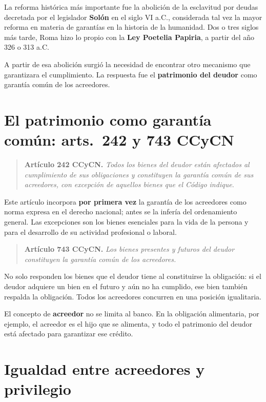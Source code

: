 \documentclass[12pt,oneside]{book}
\begin{document}
La reforma histórica más importante fue la abolición de la esclavitud por deudas decretada por el legislador \textbf{Solón} en el siglo VI a.C., considerada tal vez la mayor reforma en materia de garantías en la historia de la humanidad. Dos o tres siglos más tarde, Roma hizo lo propio con la \textbf{Ley Poetelia Papiria}, a partir del año 326 o 313 a.C.

A partir de esa abolición surgió la necesidad de encontrar otro mecanismo que garantizara el cumplimiento. La respuesta fue el \textbf{patrimonio del deudor} como garantía común de los acreedores.

\section{El patrimonio como garantía común: arts.~242 y 743 CCyCN}

\begin{quote}
\textbf{Artículo 242 CCyCN.} \textit{Todos los bienes del deudor están afectados al cumplimiento de sus obligaciones y constituyen la garantía común de sus acreedores, con excepción de aquellos bienes que el Código indique.}
\end{quote}

Este artículo incorpora \textbf{por primera vez} la garantía de los acreedores como norma expresa en el derecho nacional; antes se la infería del ordenamiento general. Las excepciones son los bienes esenciales para la vida de la persona y para el desarrollo de su actividad profesional o laboral.

\begin{quote}
\textbf{Artículo 743 CCyCN.} \textit{Los bienes presentes y futuros del deudor constituyen la garantía común de los acreedores.}
\end{quote}

No solo responden los bienes que el deudor tiene al constituirse la obligación: si el deudor adquiere un bien en el futuro y aún no ha cumplido, ese bien también respalda la obligación. Todos los acreedores concurren en una posición igualitaria.

El concepto de \textbf{acreedor} no se limita al banco. En la obligación alimentaria, por ejemplo, el acreedor es el hijo que se alimenta, y todo el patrimonio del deudor está afectado para garantizar ese crédito.

\section{Igualdad entre acreedores y privilegio}
\end{document}
